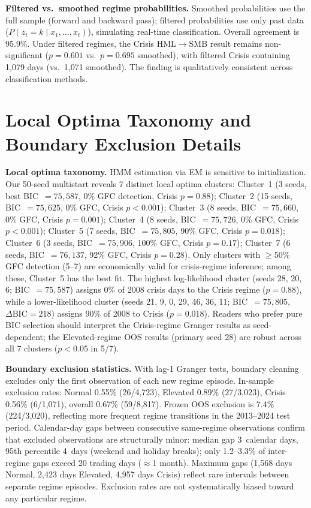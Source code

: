 \documentclass[sigconf,anonymous]{acmart}
\begin{document}
\textbf{Filtered vs.\ smoothed regime probabilities.} Smoothed probabilities use
the full sample (forward and backward pass); filtered probabilities use only past
data ($P(z_t = k \mid x_1, \ldots, x_t)$), simulating real-time classification.
Overall agreement is 95.9\%. Under filtered regimes, the Crisis HML$\to$SMB
result remains non-significant ($p = 0.601$ vs.\ $p = 0.695$ smoothed),
with filtered Crisis containing 1,079 days (vs.\ 1,071 smoothed).
The finding is qualitatively consistent across classification methods.

\section{Local Optima Taxonomy and Boundary Exclusion Details}
\label{app:optima}

\textbf{Local optima taxonomy.}
HMM estimation via EM is sensitive to initialization. Our 50-seed multistart
reveals 7 distinct local optima clusters:
Cluster~1 (3 seeds, best BIC~$= 75{,}587$, 0\% GFC detection, Crisis $p = 0.88$);
Cluster~2 (15 seeds, BIC~$= 75{,}625$, 0\% GFC, Crisis $p < 0.001$);
Cluster~3 (8 seeds, BIC~$= 75{,}660$, 0\% GFC, Crisis $p = 0.001$);
Cluster~4 (8 seeds, BIC~$= 75{,}726$, 0\% GFC, Crisis $p < 0.001$);
Cluster~5 (7 seeds, BIC~$= 75{,}805$, 90\% GFC, Crisis $p = 0.018$);
Cluster~6 (3 seeds, BIC~$= 75{,}906$, 100\% GFC, Crisis $p = 0.17$);
Cluster~7 (6 seeds, BIC~$= 76{,}137$, 92\% GFC, Crisis $p = 0.28$).
Only clusters with $\geq$50\% GFC detection (5--7) are economically valid for
crisis-regime inference; among these, Cluster~5 has the best fit.
The highest log-likelihood cluster (seeds 28, 20, 6; BIC~$= 75{,}587$)
assigns 0\% of 2008 crisis days to the Crisis regime ($p = 0.88$),
while a lower-likelihood cluster (seeds 21, 9, 0, 29, 46, 36, 11;
BIC~$= 75{,}805$, $\Delta\text{BIC} = 218$) assigns 90\% of 2008 to Crisis
($p = 0.018$). Readers who prefer pure BIC selection should interpret the
Crisis-regime Granger results as seed-dependent; the Elevated-regime OOS results
(primary seed 28) are robust across all 7 clusters ($p < 0.05$ in 5/7).

\textbf{Boundary exclusion statistics.}
With lag-1 Granger tests, boundary cleaning excludes only the first observation
of each new regime episode. In-sample exclusion rates:
Normal 0.55\% (26/4,723), Elevated 0.89\% (27/3,023), Crisis 0.56\% (6/1,071),
overall 0.67\% (59/8,817).
Frozen OOS exclusion is 7.4\% (224/3,020), reflecting more frequent
regime transitions in the 2013--2024 test period.
Calendar-day gaps between consecutive same-regime observations confirm that
excluded observations are structurally minor: median gap 3~calendar days,
95th percentile 4~days (weekend and holiday breaks);
only 1.2--3.3\% of inter-regime gaps exceed 20 trading days ($\approx$1 month).
Maximum gaps (1,568 days Normal, 2,423 days Elevated, 4,957 days Crisis)
reflect rare intervals between separate regime episodes.
Exclusion rates are not systematically biased toward any particular regime.
\end{document}
